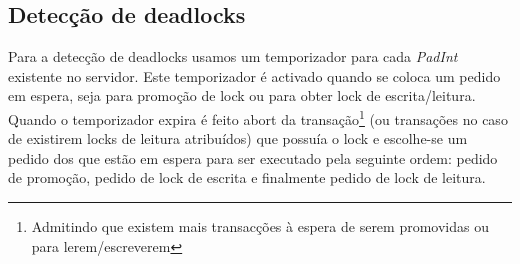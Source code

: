 \subsection{Detecção de deadlocks}

Para a detecção de deadlocks usamos um temporizador para cada \textit{PadInt} existente no servidor. Este temporizador é activado quando se coloca um pedido em espera, seja para promoção de lock ou para obter lock de escrita/leitura. Quando o temporizador expira é feito abort da transação\footnote{Admitindo que existem mais transacções à espera de serem promovidas ou para lerem/escreverem} (ou transações no caso de existirem locks de leitura atribuídos) que possuía o lock e escolhe-se um pedido dos que estão em espera para ser executado pela seguinte ordem: pedido de promoção, pedido de lock de escrita e finalmente pedido de lock de leitura.
